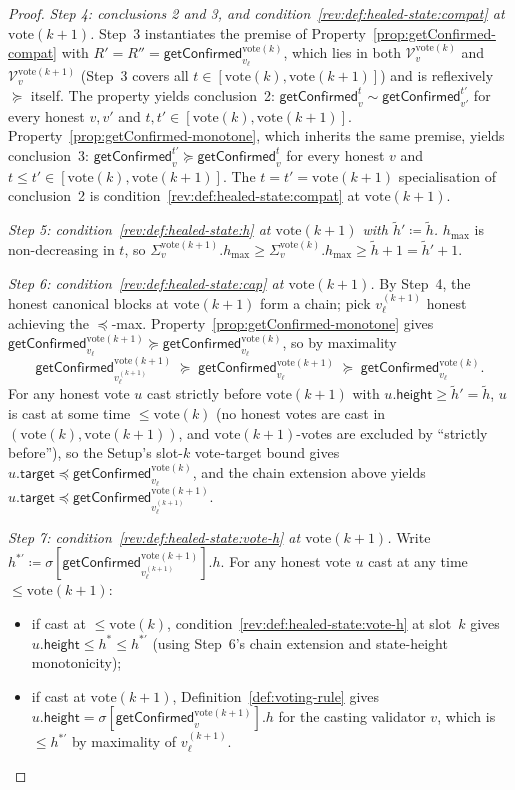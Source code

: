 \documentclass{article}
\newcommand{\V}[0]{\ensuremath{\mathcal{V}}}
\newcommand{\target}{\mathsf{target}}
\newcommand{\height}{\mathsf{height}}
\newcommand{\hmax}{\ensuremath{h_{\max}}\xspace}
\newcommand{\vote}{\ensuremath{\mathrm{vote}}}
\newcommand{\comm}[1]{\ensuremath{\widetilde{#1}}}
\newcommand{\getConfirmed}{\textsf{getConfirmed}\xspace}
\theoremstyle{plain}
\theoremstyle{definition}
\theoremstyle{remark}
\begin{document}
\begin{proof}
\medskip

\emph{Step 4: conclusions 2 and 3, and condition~\ref{rev:def:healed-state:compat} at $\vote(k{+}1)$.}
Step~3 instantiates the premise of Property~\ref{prop:getConfirmed-compat} with $R' = R'' = \getConfirmed_{v_\ell}^{\vote(k)}$, which lies in both $\V_v^{\vote(k)}$ and $\V_v^{\vote(k+1)}$ (Step~3 covers all $t \in [\vote(k), \vote(k{+}1)]$) and is reflexively $\succeq$ itself.
The property yields conclusion~2: $\getConfirmed_v^t \sim \getConfirmed_{v'}^{t'}$ for every honest $v, v'$ and $t, t' \in [\vote(k), \vote(k{+}1)]$.
Property~\ref{prop:getConfirmed-monotone}, which inherits the same premise, yields conclusion~3: $\getConfirmed_v^{t'} \succeq \getConfirmed_v^t$ for every honest $v$ and $t \leq t' \in [\vote(k), \vote(k{+}1)]$.
The $t = t' = \vote(k{+}1)$ specialisation of conclusion~2 is condition~\ref{rev:def:healed-state:compat} at $\vote(k{+}1)$.

\emph{Step 5: condition~\ref{rev:def:healed-state:h} at $\vote(k{+}1)$ with $\comm{h}' \coloneqq \comm{h}$.}
$\hmax$ is non-decreasing in $t$, so $\Sigma_v^{\vote(k+1)}.\hmax \geq \Sigma_v^{\vote(k)}.\hmax \geq \comm{h} + 1 = \comm{h}' + 1$.

\emph{Step 6: condition~\ref{rev:def:healed-state:cap} at $\vote(k{+}1)$.}
By Step~4, the honest canonical blocks at $\vote(k{+}1)$ form a chain; pick $v_\ell^{(k+1)}$ honest achieving the $\preceq$-max.
Property~\ref{prop:getConfirmed-monotone} gives $\getConfirmed_{v_\ell}^{\vote(k+1)} \succeq \getConfirmed_{v_\ell}^{\vote(k)}$, so by maximality
\[
  \getConfirmed_{v_\ell^{(k+1)}}^{\vote(k+1)} \;\succeq\; \getConfirmed_{v_\ell}^{\vote(k+1)} \;\succeq\; \getConfirmed_{v_\ell}^{\vote(k)}.
\]
For any honest vote $u$ cast strictly before $\vote(k{+}1)$ with $u.\height \geq \comm{h}' = \comm{h}$, $u$ is cast at some time $\leq \vote(k)$ (no honest votes are cast in $(\vote(k), \vote(k{+}1))$, and $\vote(k{+}1)$-votes are excluded by ``strictly before''), so the Setup's slot-$k$ vote-target bound gives $u.\target \preceq \getConfirmed_{v_\ell}^{\vote(k)}$, and the chain extension above yields $u.\target \preceq \getConfirmed_{v_\ell^{(k+1)}}^{\vote(k+1)}$.

\emph{Step 7: condition~\ref{rev:def:healed-state:vote-h} at $\vote(k{+}1)$.}
Write $h^{\ast\prime} \coloneqq \sigma[\getConfirmed_{v_\ell^{(k+1)}}^{\vote(k+1)}].h$.
For any honest vote $u$ cast at any time $\leq \vote(k{+}1)$:
\begin{itemize}
  \item if cast at $\leq \vote(k)$, condition~\ref{rev:def:healed-state:vote-h} at slot~$k$ gives $u.\height \leq h^\ast \leq h^{\ast\prime}$ (using Step~6's chain extension and state-height monotonicity);
  \item if cast at $\vote(k{+}1)$, Definition~\ref{def:voting-rule} gives $u.\height = \sigma[\getConfirmed_{v}^{\vote(k+1)}].h$ for the casting validator $v$, which is $\leq h^{\ast\prime}$ by maximality of $v_\ell^{(k+1)}$.
\end{itemize}


\end{proof}
\end{document}
